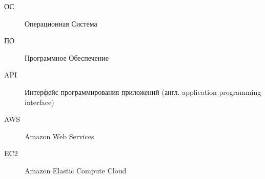 \Abbreviations %
\begin{description}
  \item[ОС] Операционная Система
  \item[ПО] Программное Обеспечение
  \item[API] Интерфейс программирования приложений (англ. application programming interface)
  \item[AWS] Amazon Web Services
  \item[EC2] Amazon Elastic Compute Cloud

\end{description}

